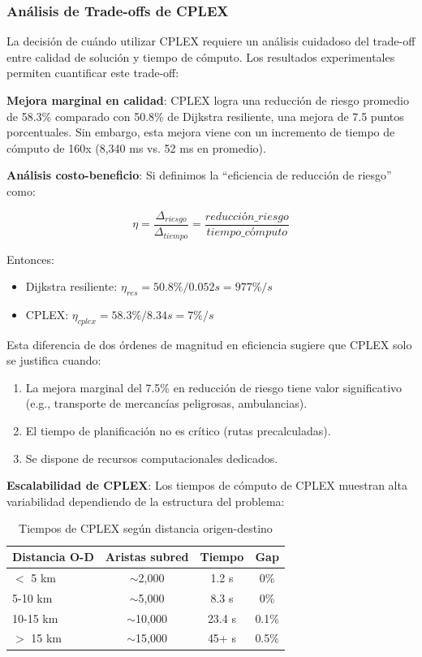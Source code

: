\documentclass[conference]{IEEEtran}
\begin{document}
\subsubsection{Análisis de Trade-offs de CPLEX}

La decisión de cuándo utilizar CPLEX requiere un análisis cuidadoso del trade-off entre calidad de solución y tiempo de cómputo. Los resultados experimentales permiten cuantificar este trade-off:

\textbf{Mejora marginal en calidad}: CPLEX logra una reducción de riesgo promedio de 58.3\% comparado con 50.8\% de Dijkstra resiliente, una mejora de 7.5 puntos porcentuales. Sin embargo, esta mejora viene con un incremento de tiempo de cómputo de 160x (8,340 ms vs. 52 ms en promedio).

\textbf{Análisis costo-beneficio}: Si definimos la ``eficiencia de reducción de riesgo'' como:

\begin{equation}
\eta = \frac{\Delta_{riesgo}}{\Delta_{tiempo}} = \frac{reducción\_riesgo}{tiempo\_cómputo}
\end{equation}

Entonces:
\begin{itemize}
    \item Dijkstra resiliente: $\eta_{res} = 50.8\% / 0.052s = 977\%/s$
    \item CPLEX: $\eta_{cplex} = 58.3\% / 8.34s = 7\%/s$
\end{itemize}

Esta diferencia de dos órdenes de magnitud en eficiencia sugiere que CPLEX solo se justifica cuando:
\begin{enumerate}
    \item La mejora marginal del 7.5\% en reducción de riesgo tiene valor significativo (e.g., transporte de mercancías peligrosas, ambulancias).
    \item El tiempo de planificación no es crítico (rutas precalculadas).
    \item Se dispone de recursos computacionales dedicados.
\end{enumerate}

\textbf{Escalabilidad de CPLEX}: Los tiempos de cómputo de CPLEX muestran alta variabilidad dependiendo de la estructura del problema:

\begin{table}[!t]
\centering
\caption{Tiempos de CPLEX según distancia origen-destino}
\begin{tabular}{@{}lccc@{}}
\toprule
\textbf{Distancia O-D} & \textbf{Aristas subred} & \textbf{Tiempo} & \textbf{Gap} \\
\midrule
$<$ 5 km & $\sim$2,000 & 1.2 s & 0\% \\
5-10 km & $\sim$5,000 & 8.3 s & 0\% \\
10-15 km & $\sim$10,000 & 23.4 s & 0.1\% \\
$>$ 15 km & $\sim$15,000 & 45+ s & 0.5\% \\
\bottomrule
\end{tabular}
\end{table}
\end{document}
